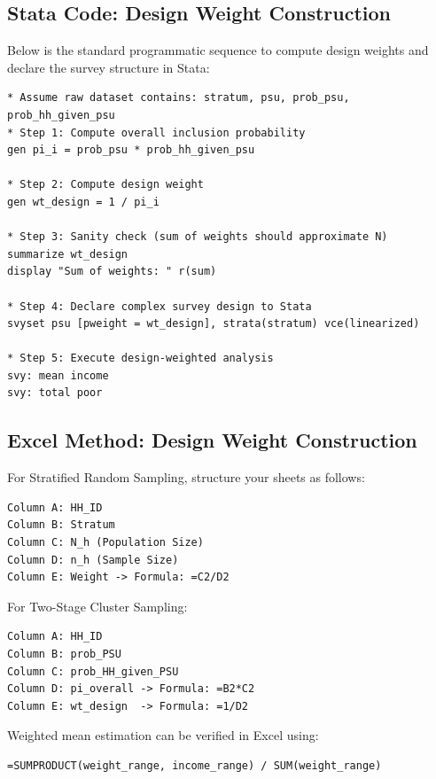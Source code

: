 \documentclass[11pt,a4paper]{article}
\begin{document}
\newpage

\subsection{Stata Code: Design Weight Construction}
Below is the standard programmatic sequence to compute design weights and declare the survey structure in Stata:

\begin{lstlisting}[style=stata, caption={Computing and Declaring Design Weights in Stata}]
* Assume raw dataset contains: stratum, psu, prob_psu, prob_hh_given_psu
* Step 1: Compute overall inclusion probability
gen pi_i = prob_psu * prob_hh_given_psu

* Step 2: Compute design weight
gen wt_design = 1 / pi_i

* Step 3: Sanity check (sum of weights should approximate N)
summarize wt_design
display "Sum of weights: " r(sum)

* Step 4: Declare complex survey design to Stata
svyset psu [pweight = wt_design], strata(stratum) vce(linearized)

* Step 5: Execute design-weighted analysis
svy: mean income
svy: total poor
\end{lstlisting}

\subsection{Excel Method: Design Weight Construction}
For Stratified Random Sampling, structure your sheets as follows:
\begin{lstlisting}[style=excel, caption={Excel Formulas for Stratified Weights}]
Column A: HH_ID
Column B: Stratum
Column C: N_h (Population Size)
Column D: n_h (Sample Size)
Column E: Weight -> Formula: =C2/D2
\end{lstlisting}

For Two-Stage Cluster Sampling:
\begin{lstlisting}[style=excel, caption={Excel Formulas for Two-Stage Cluster Weights}]
Column A: HH_ID
Column B: prob_PSU
Column C: prob_HH_given_PSU
Column D: pi_overall -> Formula: =B2*C2
Column E: wt_design  -> Formula: =1/D2
\end{lstlisting}
Weighted mean estimation can be verified in Excel using:
\begin{lstlisting}[style=excel]
=SUMPRODUCT(weight_range, income_range) / SUM(weight_range)
\end{lstlisting}
\end{document}
